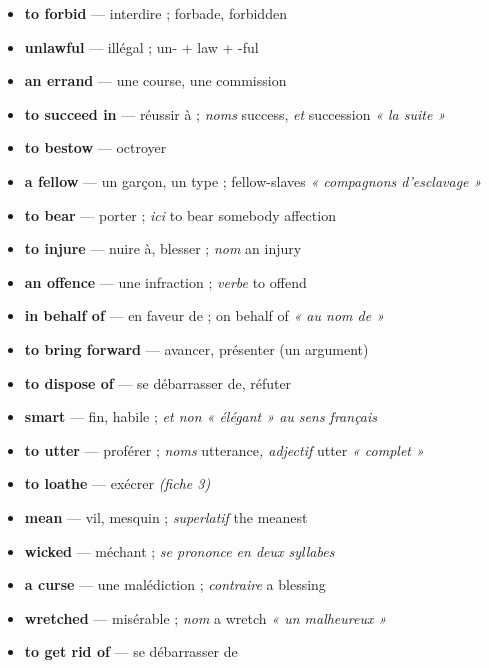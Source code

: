 \documentclass{fiche}
\begin{document}


\begin{itemize}[label=--,itemsep=0.8mm,leftmargin=*]\small
  \item \textbf{to forbid} — interdire ; forbade, forbidden
  \item \textbf{unlawful} — illégal ; un- + law + -ful
  \item \textbf{an errand} — une course, une commission
  \item \textbf{to succeed in} — réussir à ; \textit{noms} success, \textit{et} succession \textit{« la suite »}
  \item \textbf{to bestow} — octroyer
  \item \textbf{a fellow} — un garçon, un type ; fellow-slaves \textit{« compagnons d'esclavage »}
  \item \textbf{to bear} — porter ; \textit{ici} to bear somebody affection
  \item \textbf{to injure} — nuire à, blesser ; \textit{nom} an injury
  \item \textbf{an offence} — une infraction ; \textit{verbe} to offend
  \item \textbf{in behalf of} — en faveur de ; on behalf of \textit{« au nom de »}
  \item \textbf{to bring forward} — avancer, présenter (un argument)
  \item \textbf{to dispose of} — se débarrasser de, réfuter
  \item \textbf{smart} — fin, habile ; \textit{et non « élégant » au sens français}
  \item \textbf{to utter} — proférer ; \textit{noms} utterance\textit{, adjectif} utter \textit{« complet »}
  \item \textbf{to loathe} — exécrer \textit{(fiche 3)}
  \item \textbf{mean} — vil, mesquin ; \textit{superlatif} the meanest
  \item \textbf{wicked} — méchant ; \textit{se prononce en deux syllabes}
  \item \textbf{a curse} — une malédiction ; \textit{contraire} a blessing
  \item \textbf{wretched} — misérable ; \textit{nom} a wretch \textit{« un malheureux »}
  \item \textbf{to get rid of} — se débarrasser de
\end{itemize}
\end{document}
